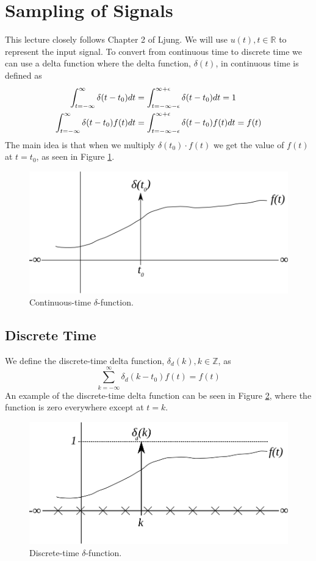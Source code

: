 % 
% 
%
%
% 
\mainmatter
\setcounter{page}{1}

\lectureseries[\course]{\course}

\date{September 29, 2009}

\setaddress

\setcounter{lecture}{1}
\setcounter{chapter}{1}


\section{Sampling of Signals}
This lecture closely follows Chapter 2 of Ljung. We will use $u(t), t \in \mathbb{R}$ to represent the input signal. To convert from continuous time to discrete time we can use a delta function where the delta function, $\delta (t)$, in continuous time is defined as
\begin{align*}
\int_{t=-\infty}^\infty \delta(t-t_0)dt &= \int_{t=-\infty-\epsilon}^{\infty+\epsilon} \delta(t-t_0)dt = 1 \\
\int_{t=-\infty}^\infty \delta(t-t_0)f(t)dt &= \int_{t=-\infty-\epsilon}^{\infty+\epsilon} \delta(t-t_0)f(t)dt = f(t)
\end{align*}
The main idea is that when we multiply $\delta(t_0) \cdot f(t)$ we get the value of $f(t)$ at $t=t_0$, as seen in Figure \ref{fig:02contDeltaFn}.
\begin{figure}[ht!]
	\centering
	\includegraphics[width=.4\textwidth]{images/02contDeltaFn}
	\caption{Continuous-time $\delta$-function.}
	\label{fig:02contDeltaFn}
\end{figure}

\subsection{Discrete Time}
We define the discrete-time delta function, $\delta_d(k), k \in \mathbb{Z}$, as
$$\sum_{k=-\infty}^\infty \delta_d(k-t_0)f(t) = f(t)$$
An example of the discrete-time delta function can be seen in Figure \ref{fig:02discDeltaFn}, where the function is zero everywhere except at $t=k$.
\begin{figure}[ht!]
	\centering
	\includegraphics[width=.4\textwidth]{images/02discDeltaFn}
	\caption{Discrete-time $\delta$-function.}
	\label{fig:02discDeltaFn}
\end{figure}

